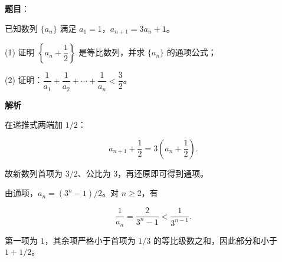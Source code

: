 \begin{answer}

\textbf{题目}：

已知数列 $\{a_n\}$ 满足 $a_1=1$，$a_{n+1}=3a_n+1$。

(1) 证明 $\left\{a_n+\dfrac12\right\}$ 是等比数列，并求 $\{a_n\}$ 的通项公式；

(2) 证明：$\dfrac1{a_1}+\dfrac1{a_2}+\cdots+\dfrac1{a_n}<\dfrac32$。

\textbf{解析}


在递推式两端加 $1/2$：

\nopagebreak[4]
\[
a_{n+1}+\frac12=3\left(a_n+\frac12\right).
\]

故新数列首项为 $3/2$、公比为 $3$，再还原即可得到通项。


由通项，$a_n=(3^n-1)/2$。对 $n\geqslant2$，有

\nopagebreak[4]
\[
\frac1{a_n}=\frac2{3^n-1}<\frac1{3^{n-1}}.
\]

第一项为 $1$，其余项严格小于首项为 $1/3$ 的等比级数之和，因此部分和小于 $1+1/2$。



\end{answer}
